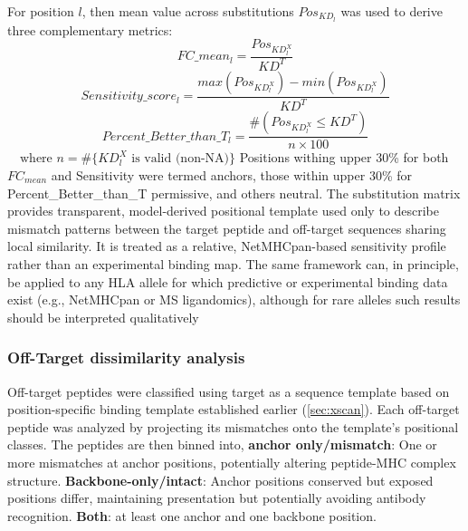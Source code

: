 \documentclass[unnumsec,webpdf,contemporary,large]{oup-authoring-template}%
\theoremstyle{thmstyleone}%
\theoremstyle{thmstyletwo}%
\theoremstyle{thmstylethree}%
\begin{document}
            For position $l$, then mean value across substitutions $Pos_{KD_{l}}$ was used to derive three complementary metrics:
            \begin{equation}
                FC\_mean_l = \frac{Pos_{KD^{X}_{l}}}{KD^{T}}\label{fc_mean}
            \end{equation}
            \begin{equation}
                Sensitivity\_score_l = \frac{max(Pos_{KD^{X}_{l}}) - min(Pos_{KD^{X}_{l}})}{KD^{T}}\label{sens}
            \end{equation}
            \begin{equation}
                Percent\_Better\_than\_T_l = \frac{\#(Pos_{KD^{X}_{l}} \leq KD^{T})}{n \times 100} 
                \label{better_wt}
            \end{equation}
        $\quad \text{where } n = \#\{ KD^{X}_{l} \text{ is valid (non-NA)} \}$ 
        Positions withing upper 30\% for both $FC_{mean}$ and Sensitivity were termed anchors, those within upper 30\% for Percent\_Better\_than\_T permissive, and others neutral.
        The substitution matrix provides transparent, model-derived positional template used only to describe mismatch patterns between the target peptide and off-target sequences sharing local similarity. It is treated as a relative, NetMHCpan-based sensitivity profile rather than an experimental binding map.
        The same framework can, in principle, be applied to any HLA allele for which predictive or experimental binding data exist (e.g., NetMHCpan or MS ligandomics), although for rare alleles such results should be interpreted qualitatively
        
        \subsubsection{Off-Target dissimilarity analysis}\label{sec:dissimilarity}
            Off-target peptides were classified using target as a sequence template based on position-specific binding template established earlier (\ref{sec:xscan}). Each off-target peptide was analyzed by projecting its mismatches onto the template’s positional classes. The peptides are then binned into, \textbf{anchor only/mismatch}: One or more mismatches at anchor positions, potentially altering peptide-MHC complex structure. \textbf{Backbone-only/intact}: Anchor positions conserved but exposed positions differ, maintaining presentation but potentially avoiding antibody recognition. \textbf{Both}: at least one anchor and one backbone position.
\end{document}

